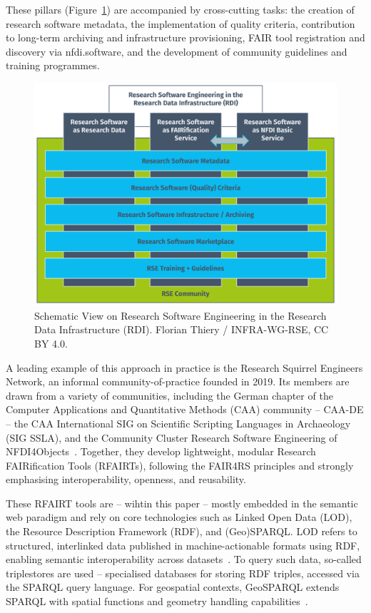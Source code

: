 \documentclass{eceasst}
\begin{document}
These pillars (Figure~\ref{fig:001}) are accompanied by cross-cutting tasks: the creation of research software metadata, the implementation of quality criteria, contribution to long-term archiving and infrastructure provisioning, FAIR tool registration and discovery via nfdi.software, and the development of community guidelines and training programmes.

\begin{figure}[h!]
\centering
\includegraphics[width=0.95\linewidth]{ECEASST-LaTeX-Templates/img/Fig_03.png}
\caption{Schematic View on Research Software Engineering in the Research Data Infrastructure (RDI). Florian Thiery / INFRA-WG-RSE, CC BY 4.0.}\label{fig:001}
\end{figure}

A leading example of this approach in practice is the Research Squirrel Engineers Network, an informal community-of-practice founded in 2019. Its members are drawn from a variety of communities, including the German chapter of the Computer Applications and Quantitative Methods (CAA) community  –  CAA-DE  –  the CAA International SIG on Scientific Scripting Languages in Archaeology (SIG SSLA), and the Community Cluster Research Software Engineering of NFDI4Objects~\cite{thiery_digitale_2025,von_rummel_nfdi4objects_2025}. Together, they develop lightweight, modular Research FAIRification Tools (RFAIRTs), following the FAIR4RS principles and strongly emphasising interoperability, openness, and reusability.

These RFAIRT tools are – wihtin this paper – mostly embedded in the semantic web paradigm and rely on core technologies such as Linked Open Data (LOD), the Resource Description Framework (RDF), and (Geo)SPARQL. LOD refers to structured, interlinked data published in machine-actionable formats using RDF, enabling semantic interoperability across datasets~\cite{schmidt_practices_2022}. To query such data, so-called triplestores are used – specialised databases for storing RDF triples, accessed via the SPARQL query language. For geospatial contexts, GeoSPARQL extends SPARQL with spatial functions and geometry handling capabilities~\cite{car_geosparql_2022}.
\end{document}
